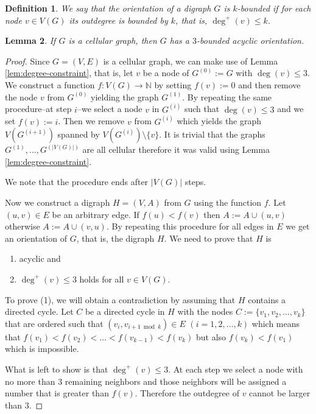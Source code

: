\documentclass[a4paper, 12pt]{article}
\newtheorem{lem}{Lemma}[section]
\newtheorem{defin}[lem]{Definition}
\begin{document}
\begin{defin}
We say that the orientation of a digraph $G$ is $k$\textit{-bounded} if for each node $v \in V(G)$ its outdegree is bounded by $k$, that is, $\deg^+(v) \leqslant k$.
\end{defin}
\begin{lem}\label{lem:bounded-acyclic-orientation}
If $G$ is a cellular graph, then $G$ has a $3$-bounded acyclic orientation.
\end{lem}
\begin{proof} Since $G=(V,E)$ is a cellular graph, we can make use of Lemma \ref{lem:degree-constraint}, that is, let $v$ be a node of $G^{(0)}:=G$ with $\deg(v) \leqslant 3$. We construct a function $f\colon V(G) \to \mathbb{N}$ by setting $f(v) := 0$ and then remove the node $v$ from $G^{(0)}$ yielding the graph $G^{(1)}$. By repeating the same procedure\---at step $i$\---we select a node $v$ in $G^{(i)}$ such that $\deg(v) \leqslant 3$ and we set $f(v):=i$. Then we remove $v$ from $G^{(i)}$ which yields the graph $V(G^{(i+1)})$ spanned by $V(G^{(i)}) \setminus \lbrace v \rbrace$. It is trivial that the graphs $G^{(1)},\ldots,G^{(|V(G)|)}$ are all cellular therefore it was valid using Lemma \ref{lem:degree-constraint}.

We note that the procedure ends after $|V(G)|$ steps.

Now we construct a digraph $H=(V,A)$ from $G$ using the function $f$. Let $(u,v) \in E$ be an arbitrary edge. If $f(u) < f(v)$ then $A:=A\cup (u,v)$ otherwise $A:=A \cup (v,u)$. By repeating this procedure for all edges in $E$ we get an orientation of $G$, that is, the digraph $H$. We need to prove that $H$ is
\begin{enumerate}
\item acyclic and
\item $\deg^+(v) \leqslant 3$ holds for all $v \in V(G)$.
\end{enumerate}
To prove (1), we will obtain a contradiction by assuming that $H$ contains a directed cycle. Let $C$ be a directed cycle in $H$ with the nodes $C:=\lbrace v_1,v_2,\ldots,v_k \rbrace$ that are ordered such that $(v_i,v_{i+1 \bmod{k}}) \in E$ $(i=1,2,\ldots,k)$ which means that $f(v_1) < f(v_2) < \ldots < f(v_{k-1}) < f(v_k)$ but also $f(v_k) < f(v_1)$ which is impossible.

What is left to show is that $\deg^+(v) \leqslant 3$. At each step we select a node with no more than $3$ remaining neighbors and those neighbors will be assigned a number that is greater than $f(v)$. Therefore the outdegree of $v$ cannot be larger than $3$.
\end{proof}
\end{document}

